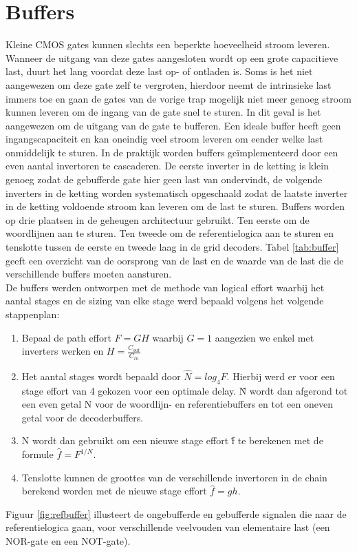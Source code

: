 \section{Buffers}
Kleine CMOS gates kunnen slechts een beperkte hoeveelheid stroom leveren. Wanneer de uitgang van deze gates aangesloten wordt op een grote capacitieve last, duurt het lang voordat deze last op- of ontladen is. Soms is het niet aangewezen om deze gate zelf te vergroten, hierdoor neemt de intrinsieke last immers toe en gaan de gates van de vorige trap mogelijk niet meer genoeg stroom kunnen leveren om de ingang van de gate snel te sturen. In dit geval is het aangewezen om de uitgang van de gate te bufferen. Een ideale buffer heeft geen ingangscapaciteit en kan oneindig veel stroom leveren om eender welke last onmiddelijk te sturen. In de praktijk worden buffers geïmplementeerd door een even aantal invertoren te cascaderen. De eerste inverter in de ketting is klein genoeg zodat de gebufferde gate hier geen last van ondervindt, de volgende inverters in de ketting worden systematisch opgeschaald zodat de laatste inverter in de ketting voldoende stroom kan leveren om de last te sturen. 
Buffers worden op drie plaatsen in de geheugen architectuur gebruikt. Ten eerste om de woordlijnen aan te sturen. Ten tweede om de referentielogica aan te sturen en tenslotte  tussen de eerste en tweede laag in de grid decoders. Tabel \ref{tab:buffer} geeft een overzicht van de oorsprong van de last en de waarde van de last die de verschillende buffers moeten aansturen.\\
De buffers werden ontworpen met de methode van logical effort\cite{Sutherland:1999:LED:298513} waarbij het aantal stages en de sizing van elke stage werd bepaald volgens het volgende stappenplan:
\begin{enumerate}
\item Bepaal de path effort $F = GH$ waarbij $G = 1$ aangezien we enkel met inverters werken en $H = \frac{C_{out}}{C_{in}}$
\item Het aantal stages wordt bepaald door $\hat{N} = log_{4}F$. Hierbij werd er voor een stage effort van 4 gekozen voor een optimale delay. \^{N} wordt dan afgerond tot een even getal N voor de woordlijn- en referentiebuffers en tot een oneven getal voor de decoderbuffers.
\item N wordt dan gebruikt om een nieuwe stage effort \^{f} te berekenen met de formule $\hat{f} = F^{1/N}$.
\item Tenslotte kunnen de groottes van de verschillende invertoren in de chain berekend worden met de nieuwe stage effort $\hat{f} = gh$.
\end{enumerate}
Figuur \ref{fig:refbuffer} illusteert de ongebufferde en gebufferde signalen die naar de referentielogica gaan, voor verschillende veelvouden van elementaire last (een NOR-gate en een NOT-gate).

